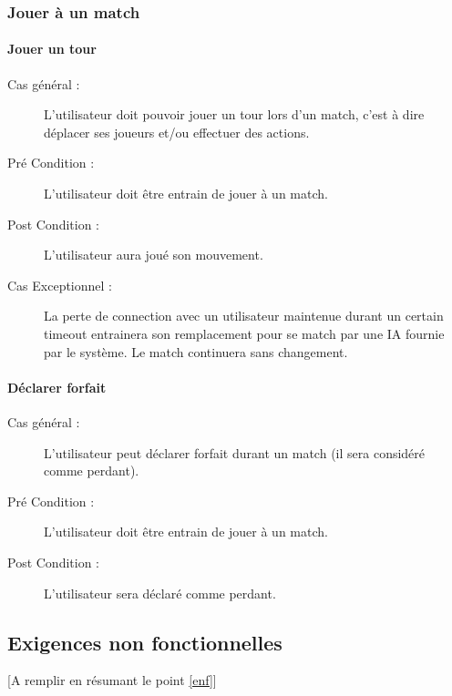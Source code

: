 \documentclass[a4paper]{article}
\begin{document}
\subsubsection{Jouer à un match}
\paragraph{Jouer un tour}
\begin{description}
\item[Cas général :] L'\gls{utilisateur} doit pouvoir jouer un tour lors d'un match, c'est à dire déplacer ses joueurs et/ou effectuer des actions.
\item[Pré Condition  :] L'utilisateur doit être entrain de jouer à un match.
\item[Post Condition :] L'utilisateur aura joué son mouvement.
\item[Cas Exceptionnel :] La perte de connection avec un \gls{utilisateur} maintenue durant un certain timeout entrainera son remplacement pour se match par une IA fournie par le système. Le match continuera sans changement.
\end{description}
\paragraph{Déclarer forfait}
\begin{description}
\item[Cas général :] L'\gls{utilisateur} peut déclarer forfait durant un match (il sera considéré comme perdant).
\item[Pré Condition  :] L'utilisateur doit être entrain de jouer à un match.
\item[Post Condition :] L'utilisateur sera déclaré comme perdant.
\end{description}


\subsection{Exigences non fonctionnelles}
[A remplir en résumant le point \ref{enf}]

\end{document}
